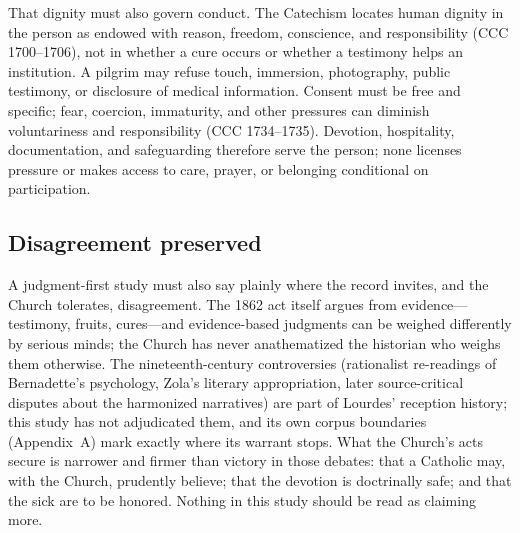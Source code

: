 That dignity must also govern conduct. The Catechism locates human
dignity in the person as endowed with reason, freedom, conscience,
and responsibility (CCC 1700--1706), not in whether a cure occurs
or whether a testimony helps an institution. A pilgrim may refuse
touch, immersion, photography, public testimony, or disclosure of
medical information. Consent must be free and specific; fear,
coercion, immaturity, and other pressures can diminish
voluntariness and responsibility (CCC 1734--1735). Devotion,
hospitality, documentation, and safeguarding therefore serve the
person; none licenses pressure or makes access to care, prayer, or
belonging conditional on participation.

\subsection{Disagreement preserved}

A judgment-first study must also say plainly where the record
invites, and the Church tolerates, disagreement. The 1862 act
itself argues from evidence---testimony, fruits, cures---and
evidence-based judgments can be weighed differently by serious
minds; the Church has never anathematized the historian who
weighs them otherwise. The nineteenth-century controversies
(rationalist re-readings of Bernadette's psychology, Zola's
literary appropriation, later source-critical disputes about the
harmonized narratives) are part of Lourdes' reception history;
this study has not adjudicated them, and its own corpus
boundaries (Appendix~A) mark exactly where its warrant stops.
What the Church's acts secure is narrower and firmer than
victory in those debates: that a Catholic may, with the Church,
prudently believe; that the devotion is doctrinally safe; and
that the sick are to be honored. Nothing in this study should be
read as claiming more.

